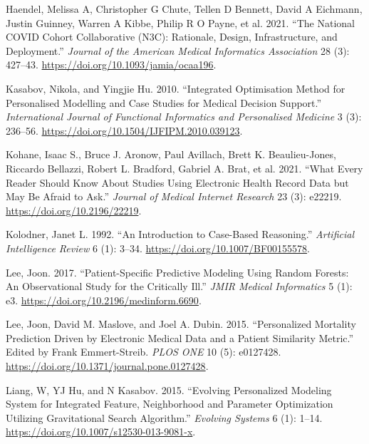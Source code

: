 \documentclass{article}
\newlength{\cslhangindent}
\newlength{\cslentryspacingunit} %
\newenvironment{CSLReferences}[2] %
 {%
  \setlength{\parindent}{0pt}
  \ifodd #1
  \let\oldpar\par
  \def\par{\hangindent=\cslhangindent\oldpar}
  \fi
  \setlength{\parskip}{#2\cslentryspacingunit}
 }%
 {}
\begin{document}
\begin{CSLReferences}{1}{0}
\leavevmode{}%
Haendel, Melissa A, Christopher G Chute, Tellen D Bennett, David A
Eichmann, Justin Guinney, Warren A Kibbe, Philip R O Payne, et al. 2021.
{``The {National COVID Cohort Collaborative} ({N3C}): {Rationale},
Design, Infrastructure, and Deployment.''} \emph{Journal of the American
Medical Informatics Association} 28 (3): 427--43.
\url{https://doi.org/10.1093/jamia/ocaa196}.

\leavevmode{}%
Kasabov, Nikola, and Yingjie Hu. 2010. {``Integrated Optimisation Method
for Personalised Modelling and Case Studies for Medical Decision
Support.''} \emph{International Journal of Functional Informatics and
Personalised Medicine} 3 (3): 236--56.
\url{https://doi.org/10.1504/IJFIPM.2010.039123}.

\leavevmode{}%
Kohane, Isaac S., Bruce J. Aronow, Paul Avillach, Brett K.
Beaulieu-Jones, Riccardo Bellazzi, Robert L. Bradford, Gabriel A. Brat,
et al. 2021. {``What {Every Reader Should Know About Studies Using
Electronic Health Record Data} but {May Be Afraid} to {Ask}.''}
\emph{Journal of Medical Internet Research} 23 (3): e22219.
\url{https://doi.org/10.2196/22219}.

\leavevmode{}%
Kolodner, Janet L. 1992. {``An Introduction to Case-Based Reasoning.''}
\emph{Artificial Intelligence Review} 6 (1): 3--34.
\url{https://doi.org/10.1007/BF00155578}.

\leavevmode{}%
Lee, Joon. 2017. {``Patient-{Specific Predictive Modeling Using Random
Forests}: {An Observational Study} for the {Critically Ill}.''}
\emph{JMIR Medical Informatics} 5 (1): e3.
\url{https://doi.org/10.2196/medinform.6690}.

\leavevmode{}%
Lee, Joon, David M. Maslove, and Joel A. Dubin. 2015. {``Personalized
{Mortality Prediction Driven} by {Electronic Medical Data} and a
{Patient Similarity Metric}.''} Edited by Frank Emmert-Streib.
\emph{PLOS ONE} 10 (5): e0127428.
\url{https://doi.org/10.1371/journal.pone.0127428}.

\leavevmode{}%
Liang, W, YJ Hu, and N Kasabov. 2015. {``Evolving Personalized Modeling
System for Integrated Feature, Neighborhood and Parameter Optimization
Utilizing Gravitational Search Algorithm.''} \emph{Evolving Systems} 6
(1): 1--14. \url{https://doi.org/10.1007/s12530-013-9081-x}.


\end{CSLReferences}
\end{document}
